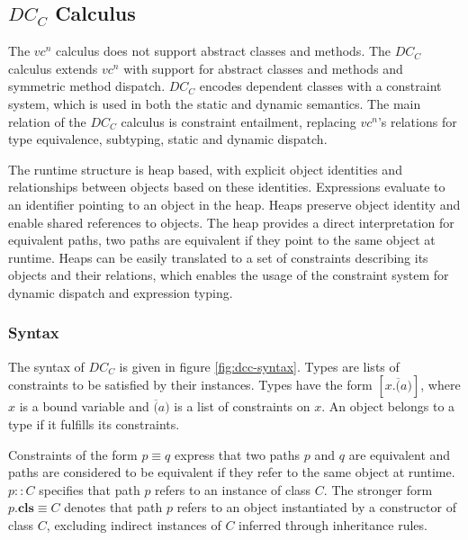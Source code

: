 \subsection{$DC_C$ Calculus}
The $vc^n$ calculus does not support abstract classes and methods.
The $DC_C$ calculus\cite{vaidas:thesis} extends $vc^n$ with support for abstract classes and methods
and symmetric method dispatch.
$DC_C$ encodes dependent classes with a constraint system,
which is used in both the static and dynamic semantics.
The main relation of the $DC_C$ calculus is constraint entailment,
replacing $vc^n$'s relations for type equivalence, subtyping, static and dynamic dispatch.

The runtime structure is heap based,
with explicit object identities
and relationships between objects based on these identities.
Expressions evaluate to an identifier pointing to an object in the heap.
Heaps preserve object identity and enable shared references to objects.
The heap provides a direct interpretation for equivalent paths,
two paths are equivalent if they point to the same object at runtime.
Heaps can be easily translated to a set of constraints describing its objects and their relations,
which enables the usage of the constraint system for dynamic dispatch and expression typing.
\subsubsection{Syntax}
The syntax of $DC_C$ is given in figure \ref{fig:dcc-syntax}.
Types are lists of constraints to be satisfied by their instances.
Types have the form $[x. \overline(a)]$, where $x$ is a bound variable
and $\overline(a)$ is a list of constraints on $x$.
An object belongs to a type if it fulfills its constraints.

Constraints of the form $p \equiv q$ express that two paths $p$ and $q$ are equivalent
and paths are considered to be equivalent if they refer to the same object at runtime.
$p :: C$ specifies that path $p$ refers to an instance of class $C$.
The stronger form $p.\textbf{cls} \equiv C$ denotes that
path $p$ refers to an object instantiated by a constructor of class $C$,
excluding indirect instances of $C$ inferred through inheritance rules.

